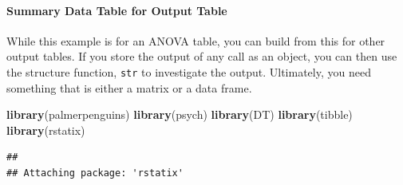 \documentclass[
]{book}
\newenvironment{Shaded}{\begin{snugshade}}{\end{snugshade}}
\newcommand{\CommentTok}[1]{\textcolor[rgb]{0.56,0.35,0.01}{\textit{#1}}}
\newcommand{\DataTypeTok}[1]{\textcolor[rgb]{0.13,0.29,0.53}{#1}}
\newcommand{\DecValTok}[1]{\textcolor[rgb]{0.00,0.00,0.81}{#1}}
\newcommand{\KeywordTok}[1]{\textcolor[rgb]{0.13,0.29,0.53}{\textbf{#1}}}
\newcommand{\NormalTok}[1]{#1}
\newcommand{\OperatorTok}[1]{\textcolor[rgb]{0.81,0.36,0.00}{\textbf{#1}}}
\newcommand{\OtherTok}[1]{\textcolor[rgb]{0.56,0.35,0.01}{#1}}
\newcommand{\StringTok}[1]{\textcolor[rgb]{0.31,0.60,0.02}{#1}}
\begin{document}
\begin{Shaded}
\end{Shaded}

\hypertarget{summary-data-table-for-output-table}{%
\paragraph{Summary Data Table for Output Table}\label{summary-data-table-for-output-table}}

While this example is for an ANOVA table, you can build from this for other output tables. If you store the output of any call as an object, you can then use the structure function, \texttt{str} to investigate the output. Ultimately, you need something that is either a matrix or a data frame.

\begin{Shaded}
\begin{Highlighting}[]
\KeywordTok{library}\NormalTok{(palmerpenguins)}
\KeywordTok{library}\NormalTok{(psych)}
\KeywordTok{library}\NormalTok{(DT)}
\KeywordTok{library}\NormalTok{(tibble)}
\KeywordTok{library}\NormalTok{(rstatix)}
\end{Highlighting}
\end{Shaded}

\begin{verbatim}
## 
## Attaching package: 'rstatix'
\end{verbatim}
\end{document}
